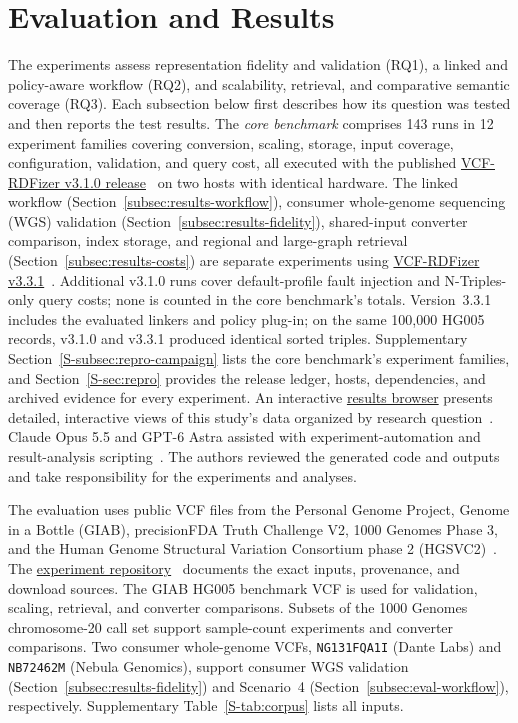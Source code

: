 \documentclass[pdflatex,sn-mathphys-num,referee]{sn-jnl}
\begin{document}
\section{Evaluation and Results}\label{sec:results}
The experiments assess representation fidelity and validation (RQ1), a linked and policy-aware workflow (RQ2), and scalability, retrieval, and comparative semantic coverage (RQ3).
Each subsection below first describes how its question was tested and then reports the test results.
The \emph{core benchmark} comprises 143 runs in 12 experiment families covering conversion, scaling, storage, input coverage, configuration, validation, and query cost, all executed with the published \href{https://github.com/ecrum19/VCF-RDFizer/tree/v3.1.0}{VCF-RDFizer v3.1.0 release}~\cite{vcfrdfizer_v310} on two hosts with identical hardware.
The linked workflow (Section~\ref{subsec:results-workflow}), consumer whole-genome sequencing (WGS) validation (Section~\ref{subsec:results-fidelity}), shared-input converter comparison, index storage, and regional and large-graph retrieval (Section~\ref{subsec:results-costs}) are separate experiments using \href{https://github.com/ecrum19/VCF-RDFizer/tree/v3.3.1}{VCF-RDFizer v3.3.1}~\cite{vcfrdfizer_v331}.
Additional v3.1.0 runs cover default-profile fault injection and N-Triples-only query costs; none is counted in the core benchmark's totals.
Version~3.3.1 includes the evaluated linkers and policy plug-in; on the same 100,000 HG005 records, v3.1.0 and v3.3.1 produced identical sorted triples.
Supplementary Section~\ref{S-subsec:repro-campaign} lists the core benchmark's experiment families, and Section~\ref{S-sec:repro} provides the release ledger, hosts, dependencies, and archived evidence for every experiment.
An interactive \href{https://ecrum19.github.io/vcf-rdfizer-testing/}{results browser} presents detailed, interactive views of this study's data organized by research question~\cite{vcfrdfizer_results_site}.
Claude Opus 5.5 and GPT-6 Astra assisted with experiment-automation and result-analysis scripting~\cite{anthropic2026claudeopus55,openai2026gpt6astra}.
The authors reviewed the generated code and outputs and take responsibility for the experiments and analyses.

The evaluation uses public VCF files from the Personal Genome Project, Genome in a Bottle (GIAB), precisionFDA Truth Challenge V2, 1000 Genomes Phase 3, and the Human Genome Structural Variation Consortium phase 2 (HGSVC2)~\cite{personal_genome_proj,giab_v421_2022,olson2022precisionfda,thousand_genomes_2015,hgsvc_2021}.
The \href{https://github.com/ecrum19/vcf-rdfizer-testing#datasets}{experiment repository}~\cite{vcfrdfizer_testing_repo} documents the exact inputs, provenance, and download sources.
The GIAB HG005 benchmark VCF is used for validation, scaling, retrieval, and converter comparisons.
Subsets of the 1000 Genomes chromosome-20 call set support sample-count experiments and converter comparisons.
Two consumer whole-genome VCFs, \texttt{NG131FQA1I} (Dante Labs) and \texttt{NB72462M} (Nebula Genomics), support consumer WGS validation (Section~\ref{subsec:results-fidelity}) and Scenario~4 (Section~\ref{subsec:eval-workflow}), respectively.
Supplementary Table~\ref{S-tab:corpus} lists all inputs.
\end{document}
